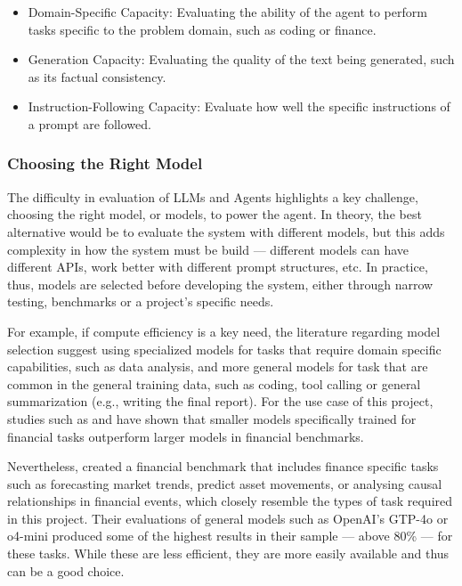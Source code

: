 \documentclass[a4paper]{report}
\begin{document}
\begin{itemize}
    \item Domain-Specific Capacity: Evaluating the ability of the agent to perform tasks specific to the problem domain, such as coding or finance.
    \item Generation Capacity: Evaluating the quality of the text being generated, such as its factual consistency.
    \item Instruction-Following Capacity: Evaluate how well the specific instructions of a prompt are followed.
\end{itemize}

\subsubsection{Choosing the Right Model}

The difficulty in evaluation of LLMs and Agents highlights a key challenge, choosing the right model, or models, to power the agent. In theory, the best alternative would be to evaluate the system with different models, but this adds complexity in how the system must be build --- different models can have different APIs, work better with different prompt structures, etc. In practice, thus, models are selected before developing the system, either through narrow testing, benchmarks or a project's specific needs.

For example, if compute efficiency is a key need, the literature regarding model selection suggest using specialized models for tasks that require domain specific capabilities, such as data analysis, and more general models for task that are common in the general training data, such as coding, tool calling or general summarization (e.g., writing the final report). For the use case of this project, studies such as \cite{ke2025demystifyingdomainadaptiveposttrainingfinancial} and \cite{tanabe2024enhancingfinancialdomainadaptation} have shown that smaller models specifically trained for financial tasks outperform larger models in financial benchmarks.

Nevertheless, \cite{lu2025bizfinbench} created a financial benchmark that includes finance specific tasks such as forecasting market trends, predict asset movements, or analysing causal relationships in financial events, which closely resemble the types of task required in this project. Their evaluations of general models such as OpenAI's GTP-4o or o4-mini produced some of the highest results in their sample --- above 80\% --- for these tasks. While these are less efficient, they are more easily available and thus can be a good choice.
\end{document}
